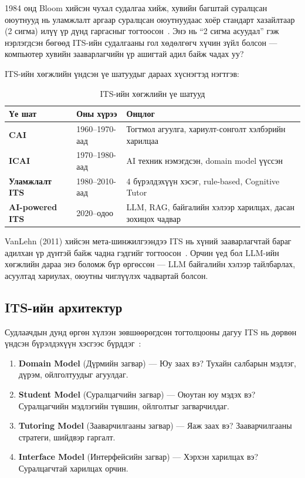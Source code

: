 \documentclass[12pt,A4]{report}
\newcommand{\eng}[1]{#1}
\begin{document}
1984 онд \eng{Bloom} хийсэн чухал судалгаа хийж, хувийн багштай суралцсан оюутнууд нь уламжлалт аргаар суралцсан оюутнуудаас хоёр стандарт хазайлтаар (2 сигма) илүү үр дүнд гаргасныг тогтоосон~\cite{bloom1984}. Энэ нь ``2 сигма асуудал'' гэж нэрлэгдсэн бөгөөд ITS-ийн судалгааны гол хөдөлгөгч хүчин зүйл болсон — компьютер хувийн зааварлагчийн үр ашигтай адил байж чадах уу?

ITS-ийн хөгжлийн үндсэн үе шатуудыг дараах хүснэгтэд нэгтгэв:

\begin{table}[h!]
\centering
\caption{ITS-ийн хөгжлийн үе шатууд}
\label{tab:its_evolution}
\begin{tabularx}{\textwidth}{>{\bfseries}l l X}
\toprule
\textbf{Үе шат} & \textbf{Оны хүрээ} & \textbf{Онцлог} \\
\midrule
\rowcolor{lightbg}
CAI & 1960--1970-аад & Тогтмол агуулга, хариулт-сонголт хэлбэрийн харилцаа \\
ICAI & 1970--1980-аад & AI техник нэмэгдсэн, \eng{domain model} үүссэн \\
\rowcolor{lightbg}
Уламжлалт ITS & 1980--2010-аад & 4 бүрэлдэхүүн хэсэг, \eng{rule-based}, \eng{Cognitive Tutor} \\
AI-powered ITS & 2020--одоо & LLM, RAG, байгалийн хэлээр харилцах, дасан зохицох чадвар \\
\bottomrule
\end{tabularx}
\end{table}

\eng{VanLehn} (2011) хийсэн мета-шинжилгээндээ ITS нь хүний зааварлагчтай бараг адилхан үр дүнтэй байж чадна гэдгийг тогтоосон~\cite{vanlehn2011}. Орчин үед бол LLM-ийн хөгжлийн дараа энэ боломж бүр өргөссөн — LLM байгалийн хэлээр тайлбарлах, асуултад хариулах, оюутны чиглүүлэх чадвартай болсон.

\subsection{ITS-ийн архитектур}

Судлаачдын дунд өргөн хүлээн зөвшөөрөгдсөн тогтолцооны дагуу ITS нь дөрвөн үндсэн бүрэлдэхүүн хэсгээс бүрддэг~\cite{freedman2000,sciencedirect2024}:

\begin{enumerate}
    \item \textbf{\eng{Domain Model}} (Дүрмийн загвар) — Юу заах вэ? Тухайн салбарын мэдлэг, дүрэм, ойлголтуудыг агуулдаг.
    \item \textbf{\eng{Student Model}} (Суралцагчийн загвар) — Оюутан юу мэдэх вэ? Суралцагчийн мэдлэгийн түвшин, ойлголтыг загварчилдаг.
    \item \textbf{\eng{Tutoring Model}} (Зааварчилгааны загвар) — Яаж заах вэ? Зааварчилгааны стратеги, шийдвэр гаргалт.
    \item \textbf{\eng{Interface Model}} (Интерфейсийн загвар) — Хэрхэн харилцах вэ? Суралцагчтай харилцах орчин.
\end{enumerate}
\end{document}
